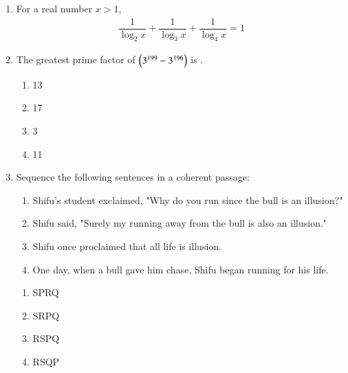 \documentclass[journal,12pt,onecolumn]{IEEEtran}
\theoremstyle{remark}
\begin{document}
\begin{enumerate}
\item For a real number $x>1$,
\begin{align*}
\dfrac{1}{\log_{2}x}+\dfrac{1}{\log_{3}x}+\dfrac{1}{\log_{4}x}=1
\end{align*}
\hfill{}

\item The greatest prime factor of $\left(3^{199}-3^{196}\right)$ is \underline{\hspace{2cm}}.
\hfill{}
\begin{multicols}{4}
\begin{enumerate}
    \item 13
    \item 17
    \item 3
    \item 11
\end{enumerate}
\end{multicols}

\item Sequence the following sentences  in a coherent passage:
\begin{enumerate}[start=16, label=\Alph*:]
    \item Shifu's student exclaimed, "Why do you run since the bull is an illusion?"
    \item Shifu said, "Surely my running away from the bull is also an illusion."
    \item Shifu once proclaimed that all life is illusion.
    \item One day, when a bull gave him chase, Shifu began running for his life.
\end{enumerate}
\hfill{}
\begin{multicols}{4}
\begin{enumerate}
    \item SPRQ
    \item SRPQ
    \item RSPQ
    \item RSQP
\end{enumerate}
\end{multicols}


\end{enumerate}
\end{document}
